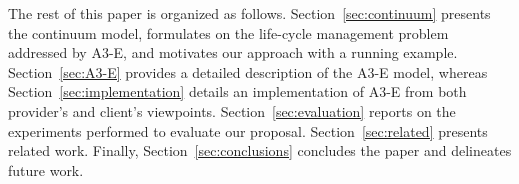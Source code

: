 



The rest of this paper is organized as follows. Section~\ref{sec:continuum} presents the continuum model, formulates on the life-cycle management problem addressed by A3-E, and motivates our approach with a running example.
Section~\ref{sec:A3-E} provides a detailed description of the A3-E model, whereas Section~\ref{sec:implementation} details an implementation of A3-E from both provider's and client's viewpoints. Section~\ref{sec:evaluation} reports on the experiments performed to evaluate our proposal. Section~\ref{sec:related} presents related work. Finally, Section~\ref{sec:conclusions} concludes the paper and delineates future work.

